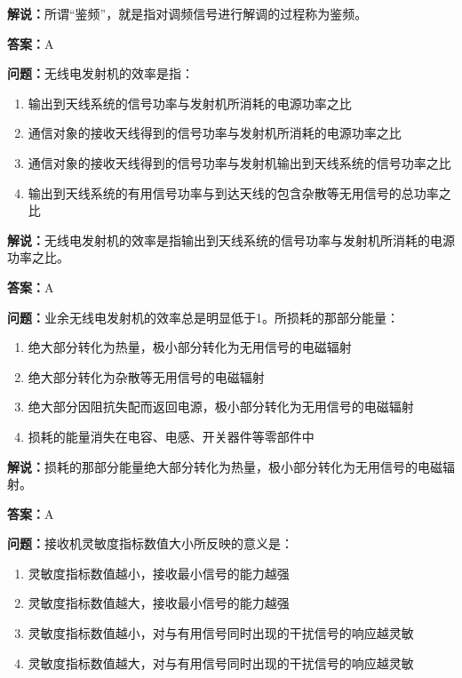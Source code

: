 \documentclass[UTF8]{ctexbook}
\begin{document}
\textbf{解说：}所谓“鉴频”，就是指对调频信号进行解调的过程称为鉴频。%

\textbf{答案：}A

\textbf{问题：}无线电发射机的效率是指：

\begin{enumerate}[label=\Alph*), leftmargin=3em]
  \item 输出到天线系统的信号功率与发射机所消耗的电源功率之比
  \item 通信对象的接收天线得到的信号功率与发射机所消耗的电源功率之比
  \item 通信对象的接收天线得到的信号功率与发射机输出到天线系统的信号功率之比
  \item 输出到天线系统的有用信号功率与到达天线的包含杂散等无用信号的总功率之比
\end{enumerate}

\textbf{解说：}无线电发射机的效率是指输出到天线系统的信号功率与发射机所消耗的电源功率之比。%

\textbf{答案：}A

\textbf{问题：}业余无线电发射机的效率总是明显低于1。所损耗的那部分能量：

\begin{enumerate}[label=\Alph*), leftmargin=3em]
  \item 绝大部分转化为热量，极小部分转化为无用信号的电磁辐射
  \item 绝大部分转化为杂散等无用信号的电磁辐射
  \item 绝大部分因阻抗失配而返回电源，极小部分转化为无用信号的电磁辐射
  \item 损耗的能量消失在电容、电感、开关器件等零部件中
\end{enumerate}

\textbf{解说：}损耗的那部分能量绝大部分转化为热量，极小部分转化为无用信号的电磁辐射。%

\textbf{答案：}A

\textbf{问题：}接收机灵敏度指标数值大小所反映的意义是：

\begin{enumerate}[label=\Alph*), leftmargin=3em]
  \item 灵敏度指标数值越小，接收最小信号的能力越强
  \item 灵敏度指标数值越大，接收最小信号的能力越强
  \item 灵敏度指标数值越小，对与有用信号同时出现的干扰信号的响应越灵敏
  \item 灵敏度指标数值越大，对与有用信号同时出现的干扰信号的响应越灵敏
\end{enumerate}
\end{document}
